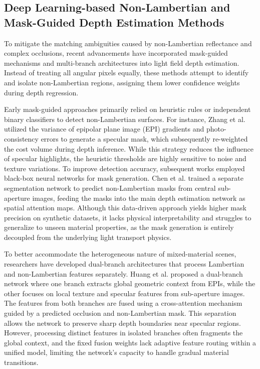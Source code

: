 \documentclass[lettersize,journal]{IEEEtran}
\begin{document}
\subsection{Deep Learning-based Non-Lambertian and Mask-Guided Depth Estimation Methods}

To mitigate the matching ambiguities caused by non-Lambertian reflectance and complex occlusions, recent advancements have incorporated mask-guided mechanisms and multi-branch architectures into light field depth estimation. Instead of treating all angular pixels equally, these methods attempt to identify and isolate non-Lambertian regions, assigning them lower confidence weights during depth regression.

Early mask-guided approaches primarily relied on heuristic rules or independent binary classifiers to detect non-Lambertian surfaces. For instance, Zhang et al.  utilized the variance of epipolar plane image (EPI) gradients and photo-consistency errors to generate a specular mask, which subsequently re-weighted the cost volume during depth inference. While this strategy reduces the influence of specular highlights, the heuristic thresholds are highly sensitive to noise and texture variations. To improve detection accuracy, subsequent works employed black-box neural networks for mask generation. Chen et al.  trained a separate segmentation network to predict non-Lambertian masks from central sub-aperture images, feeding the masks into the main depth estimation network as spatial attention maps. Although this data-driven approach yields higher mask precision on synthetic datasets, it lacks physical interpretability and struggles to generalize to unseen material properties, as the mask generation is entirely decoupled from the underlying light transport physics.

To better accommodate the heterogeneous nature of mixed-material scenes, researchers have developed dual-branch architectures that process Lambertian and non-Lambertian features separately. Huang et al.  proposed a dual-branch network where one branch extracts global geometric context from EPIs, while the other focuses on local texture and specular features from sub-aperture images. The features from both branches are fused using a cross-attention mechanism guided by a predicted occlusion and non-Lambertian mask. This separation allows the network to preserve sharp depth boundaries near specular regions. However, processing distinct features in isolated branches often fragments the global context, and the fixed fusion weights lack adaptive feature routing within a unified model, limiting the network's capacity to handle gradual material transitions.
\end{document}
